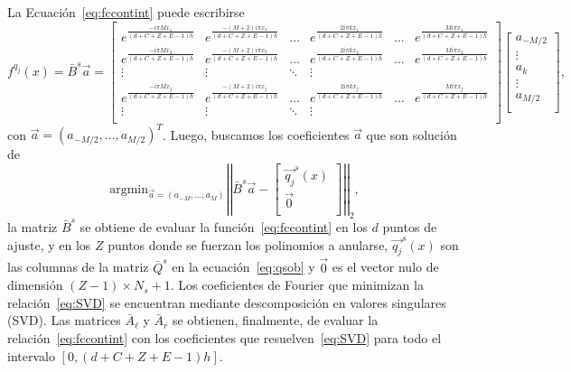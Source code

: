 La Ecuación~\eqref{eq:fccontint} puede escribirse
\begin{equation*}
f^{q_j}(x)=\bar{B}^s \vec{a}=
\begin{bmatrix}
    e^{\frac{-i\pi M x_1}{(d+C+Z+E-1)h}}  & e^{\frac{-(M+2)i\pi  x_1}{(d+C+Z+E-1)h}} & \dots & 
    e^{\frac{2i\pi k x_1}{(d+C+Z+E-1)h}}  & \dots  & e^{\frac{M i\pi  x_1}{(d+C+Z+E-1)h}} \\
    e^{\frac{-i\pi M x_2}{(d+C+Z+E-1)h}}  & e^{\frac{-(M+2)i\pi  x_2}{(d+C+Z+E-1)h}}  & \dots & 
    e^{\frac{2i\pi k x_2}{(d+C+Z+E-1)h}}  & \dots  & e^{\frac{M i\pi  x_2}{(d+C+Z+E-1)h}} \\
    \vdots  & \vdots & \ddots & \vdots \\
    e^{\frac{-i\pi M x_j}{(d+C+Z+E-1)h}}  & e^{\frac{-(M+2)i\pi  x_j}{(d+C+Z+E-1)h}}  & \dots & 
    e^{\frac{2i\pi k x_j}{(d+C+Z+E-1)h}}  & \dots & e^{\frac{M i\pi  x_j}{(d+C+Z+E-1)h}} \\
    \vdots  & \vdots & \ddots & \vdots \\
\end{bmatrix}
\begin{bmatrix}
    a_{-M/2}\\
    \vdots\\
    a_k\\
    \vdots\\
    a_{M/2} \\
\end{bmatrix},
\label{eq:fccontint2}
\end{equation*}
con $\vec{a}=(a_{-M/2},\ldots,a_{M/2})^T$. 
Luego, buscamos los coeficientes $\vec{a}$ que son solución de 
\begin{equation}
\text{argmin}_{\vec{a}=(a_{-M},\ldots,a_M)} \left | \left|\bar{B}^s \vec{a}-
\begin{bmatrix}
    \vec{q_j}^s(x)\\
    \vec{0} \\
\end{bmatrix}
\right|\right|_2,
\label{eq:SVD}
\end{equation}
la matriz $\bar{B}^s$ se obtiene 
de evaluar la función~\eqref{eq:fccontint} en los $d$ puntos de ajuste, y en los $Z$ puntos donde se fuerzan los polinomios a anularse, $ \vec{q_j}^s(x)$ son las columnas 
de la matriz $\bar{Q}^s$ en la ecuación~\eqref{eq:qsob} y $\vec{0}$ es el vector nulo de dimensión $(Z-1)\times N_s +1$. Los coeficientes de Fourier que minimizan la relación~\eqref{eq:SVD} se encuentran mediante descomposición en valores singulares (SVD). 
Las matrices $\bar{A}_{\ell}$ y $\bar{A}_{r}$ se obtienen, finalmente, de evaluar la relación~\eqref{eq:fccontint} con los coeficientes que resuelven~\eqref{eq:SVD} 
para todo el intervalo $[0,(d+C+Z+E-1)h]$.

